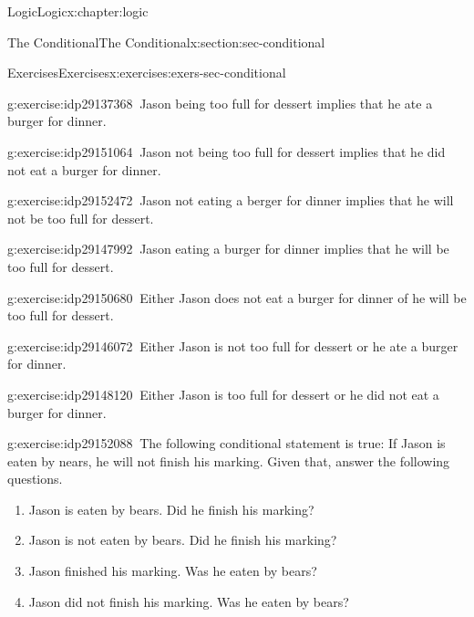 \documentclass[twoside,10pt,]{book}
\numberwithin{equation}{section}
\begin{document}
\begin{chapterptx}{Logic}{}{Logic}{}{}{x:chapter:logic}
\begin{sectionptx}{The Conditional}{}{The Conditional}{}{}{x:section:sec-conditional}
\begin{exercises-subsection}{Exercises}{}{Exercises}{}{}{x:exercises:exers-sec-conditional}
\begin{exercisegroup}
\begin{divisionexerciseeg}{12}{}{}{g:exercise:idp29137368}
\(\ \)Jason being too full for dessert implies that he ate a burger for dinner.\end{divisionexerciseeg}%
\begin{divisionexerciseeg}{13}{}{}{g:exercise:idp29151064}%
\(\ \)Jason not being too full for dessert implies that he did not eat a burger for dinner.\end{divisionexerciseeg}%
\begin{divisionexerciseeg}{14}{}{}{g:exercise:idp29152472}%
\(\ \)Jason not eating a berger for dinner implies that he will not be too full for dessert.\end{divisionexerciseeg}%
\begin{divisionexerciseeg}{15}{}{}{g:exercise:idp29147992}%
\(\ \)Jason eating a burger for dinner implies that he will be too full for dessert.\end{divisionexerciseeg}%
\begin{divisionexerciseeg}{16}{}{}{g:exercise:idp29150680}%
\(\ \)Either Jason does not eat a burger for dinner of he will be too full for dessert.\end{divisionexerciseeg}%
\begin{divisionexerciseeg}{17}{}{}{g:exercise:idp29146072}%
\(\ \)Either Jason is not too full for dessert or he ate a burger for dinner.\end{divisionexerciseeg}%
\begin{divisionexerciseeg}{18}{}{}{g:exercise:idp29148120}%
\(\ \)Either Jason is too full for dessert or he did not eat a burger for dinner.\end{divisionexerciseeg}%
\end{exercisegroup}
\par\medskip\noindent
\begin{divisionexercise}{19}{}{}{g:exercise:idp29152088}%
\(\ \)The following conditional statement is true: If Jason is eaten by nears, he will not finish his marking.  Given that, answer the following questions. %
\begin{enumerate}[label=(\alph*)]
\item{}Jason is eaten by bears.  Did he finish his marking?%
\item{}Jason is not eaten by bears.  Did he finish his marking?%
\item{}Jason finished his marking.  Was he eaten by bears?%
\item{}Jason did not finish his marking.  Was he eaten by bears?%
\end{enumerate}
\end{divisionexercise}%

\end{exercises-subsection}
\end{sectionptx}
\end{chapterptx}
\end{document}
